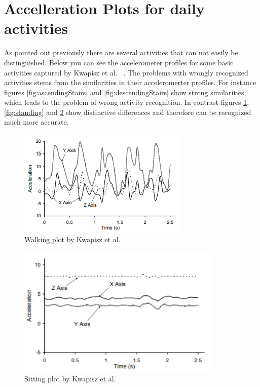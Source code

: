 \documentclass[conference]{IEEEtran}
\begin{document}
\section{Accelleration Plots for daily activities}
As pointed out previously there are several activities that can not easily be distinguished. Below you can see the accelerometer profiles for some basic activities captured by Kwapisz et al. ~\cite{Kwapisz2011}. 
The problems with wrongly recognized activities stems from the similarities in their acceleromerter profiles. For instance figures \ref{fig:ascendingStairs} and \ref{fig:descendingStairs} show strong similarities, which leads to the problem of wrong activity recognition. In contrast figures \ref{fig:walking}, \ref{fig:standing} and \ref {fig:sitting} show distinctive differences and therefore can be recognized much more accurate.\newpage
\begin{figure}[!p]
  \includegraphics[width=\linewidth]{walking.png}
  \caption{Walking plot by Kwapisz et al. ~\cite{Kwapisz2011} }
  \label{fig:walking}
\end{figure}
\begin{figure}[!p]
  \includegraphics[width=\linewidth]{sitting.png}
  \caption{Sitting plot by Kwapisz et al. ~\cite{Kwapisz2011}}
  \label{fig:sitting}
\end{figure}
\end{document}
